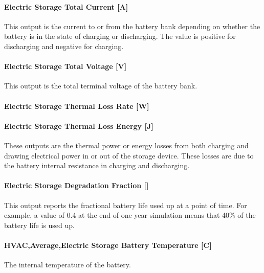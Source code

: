 \paragraph{Electric Storage Total Current {[}A{]}}\label{liion-total-current-a}

This output is the current to or from the battery bank depending on whether the battery is in the state of charging or discharging. The value is positive for discharging and negative for charging.

\paragraph{Electric Storage Total Voltage {[}V{]}}\label{liion-total-voltage-v}

This output is the total terminal voltage of the battery bank.

\paragraph{Electric Storage Thermal Loss Rate {[}W{]}}\label{liion-thermal-loss-rate-w-1}

\paragraph{Electric Storage Thermal Loss Energy {[}J{]}}\label{liion-thermal-loss-energy-j-1}

These outputs are the thermal power or energy losses from both charging and drawing electrical power in or out of the storage device. These losses are due to the battery internal resistance in charging and discharging.

\paragraph{Electric Storage Degradation Fraction {[]}}\label{liion-degradation-fraction}

This output reports the fractional battery life used up at a point of time. For example, a value of 0.4 at the end of one year simulation means that 40\% of the battery life is used up.

\paragraph{HVAC,Average,Electric Storage Battery Temperature {[}C{]}}\label{liion-battery-temperature}

The internal temperature of the battery.

